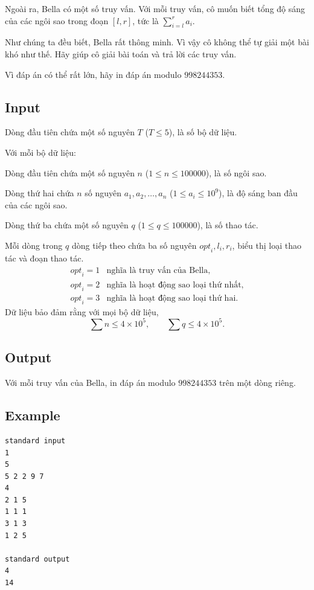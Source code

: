 \documentclass[11pt]{article}
\begin{document}
Ngoài ra, Bella có một số truy vấn. Với mỗi truy vấn, cô muốn biết tổng độ
sáng của các ngôi sao trong đoạn $[l,r]$, tức là $\sum_{i=l}^{r} a_i$.

Như chúng ta đều biết, Bella rất thông minh. Vì vậy cô không thể tự giải một
bài khó như thế. Hãy giúp cô giải bài toán và trả lời các truy vấn.

Vì đáp án có thể rất lớn, hãy in đáp án modulo $998244353$.

\subsection*{Input}

Dòng đầu tiên chứa một số nguyên $T$ ($T\le 5$), là số bộ dữ liệu.

Với mỗi bộ dữ liệu:

Dòng đầu tiên chứa một số nguyên $n$ ($1\le n\le 100000$), là số ngôi sao.

Dòng thứ hai chứa $n$ số nguyên $a_1,a_2,\ldots,a_n$ ($1\le a_i\le 10^9$),
là độ sáng ban đầu của các ngôi sao.

Dòng thứ ba chứa một số nguyên $q$ ($1\le q\le 100000$), là số thao tác.

Mỗi dòng trong $q$ dòng tiếp theo chứa ba số nguyên
$\mathit{opt}_i,l_i,r_i$, biểu thị loại thao tác và đoạn thao tác.
\[
\begin{array}{ll}
\mathit{opt}_i=1 & \text{nghĩa là truy vấn của Bella,}\\
\mathit{opt}_i=2 & \text{nghĩa là hoạt động sao loại thứ nhất,}\\
\mathit{opt}_i=3 & \text{nghĩa là hoạt động sao loại thứ hai.}
\end{array}
\]
Dữ liệu bảo đảm rằng với mọi bộ dữ liệu,
\[
  \sum n\le 4\times 10^5,\qquad \sum q\le 4\times 10^5.
\]

\subsection*{Output}

Với mỗi truy vấn của Bella, in đáp án modulo $998244353$ trên một dòng riêng.

\subsection*{Example}

\begin{verbatim}
standard input
1
5
5 2 2 9 7
4
2 1 5
1 1 1
3 1 3
1 2 5

standard output
4
14
\end{verbatim}
\end{document}
